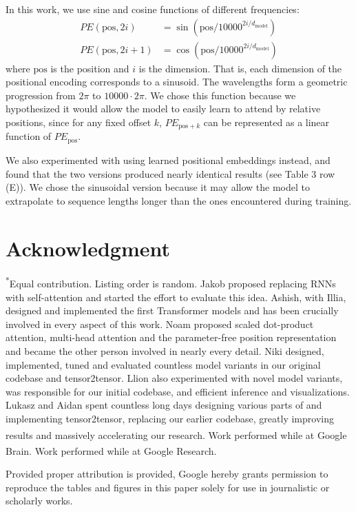 \documentclass[conference]{IEEEtran}
\begin{document}
In this work, we use sine and cosine functions of different frequencies:
\begin{align*}
PE(\text{pos}, 2i) &= \sin(\text{pos}/10000^{2i/d_{\text{model}}}) \\
PE(\text{pos}, 2i+1) &= \cos(\text{pos}/10000^{2i/d_{\text{model}}})
\end{align*}
where $\text{pos}$ is the position and $i$ is the dimension. That is, each dimension of the positional encoding corresponds to a sinusoid. The wavelengths form a geometric progression from $2\pi$ to $10000 \cdot 2\pi$. We chose this function because we hypothesized it would allow the model to easily learn to attend by relative positions, since for any fixed offset $k$, $PE_{\text{pos} + k}$ can be represented as a linear function of $PE_{\text{pos}}$.

We also experimented with using learned positional embeddings \cite{ref9} instead, and found that the two versions produced nearly identical results (see Table 3 row (E)). We chose the sinusoidal version because it may allow the model to extrapolate to sequence lengths longer than the ones encountered during training.

\section*{Acknowledgment}
\textsuperscript{*}Equal contribution. Listing order is random. Jakob proposed replacing RNNs with self-attention and started the effort to evaluate this idea. Ashish, with Illia, designed and implemented the first Transformer models and has been crucially involved in every aspect of this work. Noam proposed scaled dot-product attention, multi-head attention and the parameter-free position representation and became the other person involved in nearly every detail. Niki designed, implemented, tuned and evaluated countless model variants in our original codebase and tensor2tensor. Llion also experimented with novel model variants, was responsible for our initial codebase, and efficient inference and visualizations. Lukasz and Aidan spent countless long days designing various parts of and implementing tensor2tensor, replacing our earlier codebase, greatly improving results and massively accelerating our research. \textsuperscript{\textdagger}Work performed while at Google Brain. \textsuperscript{\textddagger}Work performed while at Google Research.

Provided proper attribution is provided, Google hereby grants permission to reproduce the tables and figures in this paper solely for use in journalistic or scholarly works.
\end{document}
